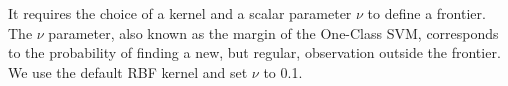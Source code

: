  It requires the choice of a kernel and a scalar parameter $\nu$ to define a frontier.  The $\nu$ parameter, also known as the margin of the One-Class SVM, corresponds to the probability of finding a new, but regular, observation outside the frontier. We use the default RBF kernel and set $\nu$ to 0.1.





